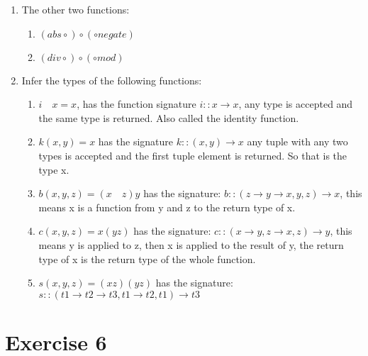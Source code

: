 \documentclass{article}
\begin{document}
\begin{enumerate}
\begin{enumerate}
    \end{enumerate}
    \item The other two functions:
    \begin{enumerate}
        \item $(abs \circ) \circ (\circ negate)$
        \item $(div \circ) \circ (\circ mod)$
    \end{enumerate}
    \item Infer the types of the following functions:
    \begin{enumerate}
        \item $i \quad x = x$, has the function signature $i::x \rightarrow x$, any type is accepted and the same type is returned. Also called the identity function.
        \item $k (x, y) = x$ has the signature $k::(x , y) \rightarrow x$ any tuple with any two types is accepted and the first tuple element is returned. So that is the type x.
        \item $b (x, y, z) = (x \quad z) y$ has the signature: $b :: (z \rightarrow y \rightarrow x, y, z) \rightarrow x$, this means x is a function from y and z to the return type of x.
        \item $c (x, y, z) = x (y z)$ has the signature: $c::(x \rightarrow y, z \rightarrow x, z) \rightarrow y$, this means y is applied to z, then x is applied to the result of y, the return type of x is the return type of the whole function.
        \item $s (x, y, z) = (x z) (y z)$ has the signature: $s::(t1 \rightarrow t2 \rightarrow t3, t1 \rightarrow t2, t1) \rightarrow t3$
    \end{enumerate}
\end{enumerate}

\section*{Exercise 6}
\end{document}
